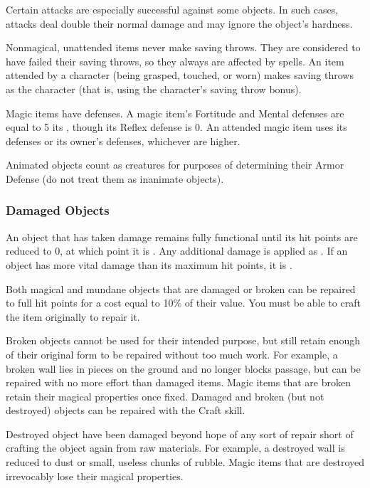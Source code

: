              Certain attacks are especially successful against some objects. In such cases, attacks deal double their normal damage and may ignore the object's hardness.

             Nonmagical, unattended items never make saving throws. They are considered to have failed their saving throws, so they always are affected by spells. An item attended by a character (being grasped, touched, or worn) makes saving throws as the character (that is, using the character's saving throw bonus).

            \par Magic items have defenses. A magic item's Fortitude and Mental defenses are equal to 5 \add its , though its Reflex defense is 0. An attended magic item uses its defenses or its owner's defenses, whichever are higher.

             Animated objects count as creatures for purposes of determining their Armor Defense (do not treat them as inanimate objects).


        \subsubsection{Damaged Objects}
            An object that has taken damage remains fully functional until its hit points are reduced to 0, at which point it is .
            Any additional damage is applied as .
            If an object has more vital damage than its maximum hit points, it is .

            Both magical and mundane objects that are damaged or broken can be repaired to full hit points for a cost equal to 10\% of their value.
            You must be able to craft the item originally to repair it.

            \label{Broken Objects}
            Broken objects cannot be used for their intended purpose, but still retain enough of their original form to be repaired without too much work. For example, a broken wall lies in pieces on the ground and no longer blocks passage, but can be repaired with no more effort than damaged items. Magic items that are broken retain their magical properties once fixed. Damaged and broken (but not destroyed) objects can be repaired with the Craft skill.

            \label{Destroyed Objects}
            Destroyed object have been damaged beyond hope of any sort of repair short of crafting the object again from raw materials.
            For example, a destroyed wall is reduced to dust or small, useless chunks of rubble.
            Magic items that are destroyed irrevocably lose their magical properties.

